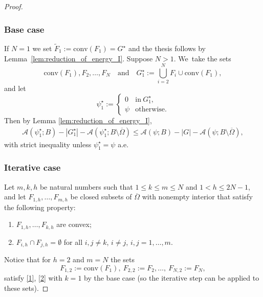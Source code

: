 \documentclass[11pt]{article}
\newcommand{\skpt}{\smallskip}
\numberwithin{equation}{section}
\let\Om\Omega
\theoremstyle{definition}
\begin{document}
\skpt
\begin{proof}\vspace*{-\baselineskip}

\subsubsection*{Base case}
If $N=1$ we set $\widetilde F_1:= \mathrm{conv}(F_1)=G^\star$ and the thesis follows by Lemma~\ref{lem:reduction_of_energy_I}. Suppose $N >1$. We~take the sets
\begin{equation}\label{sets_base_case}
\mathrm{conv}(F_1), F_2, \dots, F_N\quad\text{and}\quad G_1^\star:=\bigcup_{i=2}^NF_{i}\cup\mathrm{conv}(F_1),
\end{equation}
and let
\begin{equation*}
\psi_1^\star:=\begin{cases}
0&\text{in}\ G_1^\star,\\
\psi&\text{otherwise}.
\end{cases}
\end{equation*}
Then by Lemma \ref{lem:reduction_of_energy_I},
\begin{align}\label{base_case}
\mathcal A(\psi_1^\star;B)-|G_1^\star|-\mathcal A(\psi_1^\star;B\setminus \overline\Omega)\leq
\mathcal A(\psi;B)-|G|-\mathcal A(\psi;B\setminus \overline\Omega),
\end{align}
with strict inequality unless $\psi_1^\star=\psi$ a.e.

\subsubsection*{Iterative case}
Let $m,k,h$ be natural numbers such that $1\le k\le m\le N$ and $1<h\le 2N-1$, and let $F_{1,h},\dots,F_{m,h}$ be closed subsets of $\overline \Om$
with nonempty interior that satisfy the following property:
\begin{enumerate}[label=($\arabic*$),wide]
\item \label{1}$F_{1,h},\dots,F_{k,h}$ are convex;
\item\label{2} $F_{i,h}\cap F_{j,h}=\emptyset$ for all $i, j\ne k$, $i\ne j$, $i,j=1,\dots,m$.
\end{enumerate}
Notice that for $h=2$ and $m=N$ the sets
\begin{equation*}
F_{1,2}:=\mathrm{conv}(F_1),\ F_{2,2}:=F_2,\dots,\ F_{N,2}:=F_N,
\end{equation*}
satisfy \ref{1}, \ref{2} with $k=1$ by the base case (so the iterative step can be applied to these sets).


\end{proof}
\end{document}
